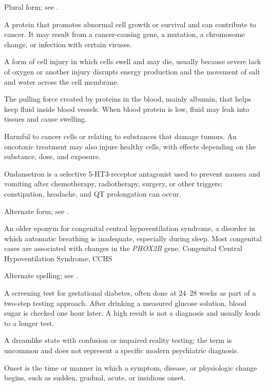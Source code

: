  Plural form; see .

 A protein that promotes abnormal cell growth or survival and can contribute to cancer. It may result from a cancer-causing gene, a mutation, a chromosome change, or infection with certain viruses.

 A form of cell injury in which cells swell and may die, usually because severe lack of oxygen or another injury disrupts energy production and the movement of salt and water across the cell membrane.

 The pulling force created by proteins in the blood, mainly albumin, that helps keep fluid inside blood vessels. When blood protein is low, fluid may leak into tissues and cause swelling.

 Harmful to cancer cells or relating to substances that damage tumors. An oncotoxic treatment may also injure healthy cells, with effects depending on the substance, dose, and exposure.

 Ondansetron is a selective 5-HT3-receptor antagonist used to prevent nausea and vomiting after chemotherapy, radiotherapy, surgery, or other triggers; constipation, headache, and QT prolongation can occur.

 Alternate form; see .

 An older eponym for congenital central hypoventilation syndrome, a disorder in which automatic breathing is inadequate, especially during sleep. Most congenital cases are associated with changes in the \textit{PHOX2B} gene.
\synonyms
Congenital Central Hypoventilation Syndrome; CCHS

 Alternate spelling; see .

 A screening test for gestational diabetes, often done at 24–28 weeks as part of a two-step testing approach. After drinking a measured glucose solution, blood sugar is checked one hour later. A high result is not a diagnosis and usually leads to a longer test.

 A dreamlike state with confusion or impaired reality testing; the term is uncommon and does not represent a specific modern psychiatric diagnosis.

 Onset is the time or manner in which a symptom, disease, or physiologic change begins, such as sudden, gradual, acute, or insidious onset.

